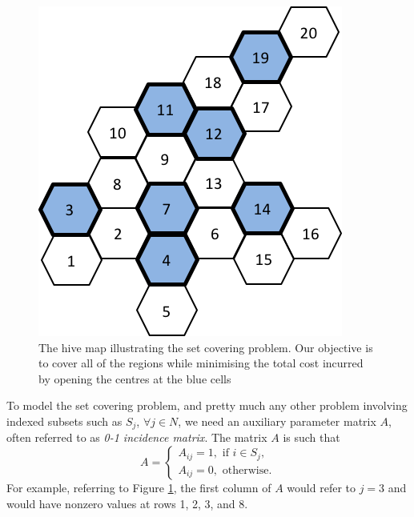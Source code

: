\begin{figure}[h]
	\centering
	\includegraphics[scale=0.8]{chapters/chapter_8/figures/hive_setcover.png}
	\caption{The hive map illustrating the set covering problem. Our objective is to cover all of the regions while minimising the total cost incurred by opening the centres at the blue cells} \label{p1c8:fig:set_covering}
\end{figure}

To model the set covering problem, and pretty much any other problem involving indexed subsets such as $S_j$, $\forall j \in N$, we need an auxiliary parameter matrix $A$, often referred to as \emph{0-1 incidence matrix}. The matrix $A$ is such that
%
\begin{equation*}
	A = \begin{cases}
		A_{ij} = 1, \text{ if } i \in S_j, \\
		A_{ij} = 0, \text{ otherwise.}
	\end{cases}
\end{equation*}
%
For example, referring to Figure \ref{p1c8:fig:set_covering}, the first column of $A$ would refer to $j = 3$ and would have nonzero values at rows 1, 2, 3, and 8.

